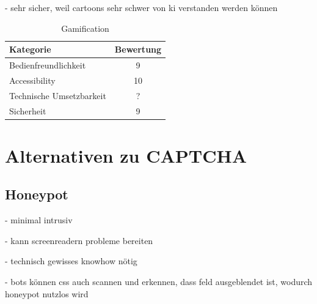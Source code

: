 - sehr sicher, weil cartoons sehr schwer von ki verstanden werden können



\begin{table}[h!]
    \caption{Gamification}
    \begin{center}
        \begin{tabular}{l|c}
            Kategorie                       & Bewertung \\\hline
            Bedienfreundlichkeit            & 9         \\
            Accessibility                   & 10        \\
            Technische Umsetzbarkeit        & ?         \\
            Sicherheit                      & 9         
        \end{tabular}
    \end{center}
\end{table}

\section{Alternativen zu CAPTCHA}

\subsection{Honeypot}

- minimal intrusiv

- kann screenreadern probleme bereiten

- technisch gewisses knowhow nötig

- bots können css auch scannen und erkennen, dass feld ausgeblendet ist, wodurch honeypot nutzlos wird

